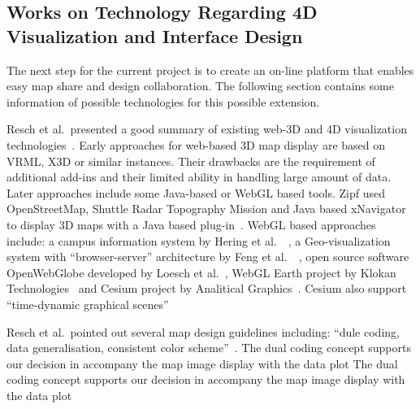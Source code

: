 \documentclass[hidelinks,12pt]{article}
\newcommand{\grey}[1]{\textcolor{black!30}{#1}}
\begin{document}
\begin{comment}
``Data Visualization with Spacetime Maps'', Richard L. Brownrigg, 2005
(read further later on)

\grey{To be continued later:
\begin{enumerate}[label*=\arabic*.]
\item ``Geographic Visualization: Designing Manipulable Maps for
    Exploring Temporally Varying Georeferenced Statistics'', MacEachren et al.\
\item ``Strategies for the Visualization of Geographic Time-Series
    Data'', Mark Monmonier, 2011
\item ``Evaluation of Methods for Classifying Epidemiological Data
    on Choropleth Maps in Series'', Brewer and Pickle, 2002
\end{enumerate}}
\end{comment}

\subsection{Works on Technology Regarding 4D Visualization and
  Interface Design}
The next step for the current project is to create an on-line platform
that enables easy map share and design collaboration. The following
section contains some information of possible technologies for this
possible extension.

Resch et al.\ presented a good summary of existing web-3D and 4D
visualization technologies~\cite{Resch2014}. Early approaches for
web-based 3D map display are based on VRML, X3D or similar
instances. Their drawbacks are the requirement of additional add-ins
and their limited ability in handling large amount of data. Later
approaches include some Java-based or WebGL based tools. Zipf used
OpenStreetMap, Shuttle Radar Topography Mission and Java based
xNavigator to display 3D maps with a Java based
plug-in~\cite{Zipf2014}. WebGL based approaches include: a campus
information system by Hering et al.\ ~\cite{Hering2011}, a
Geo-visualization system with ``browser-server'' architecture by Feng
et al.\ ~\cite{Feng2011}, open source software OpenWebGlobe developed
by Loesch et al.\ , WebGL Earth project by Klokan
Technologies~\cite{KlokanTechnologies2015} and Cesium project by
Analitical Graphics~\cite{AGI2015}. Cesium also support ``time-dynamic
graphical scenes''~\cite{CZML2015}

Resch et al.\ pointed out several map design guidelines including:
``dule coding, data generalisation, consistent color
scheme''~\cite{Resch2014}. The dual coding concept supports our
decision in accompany the map image display with the data plot The
dual coding concept supports our decision in accompany the map image
display with the data plot
\newpage
\end{document}
